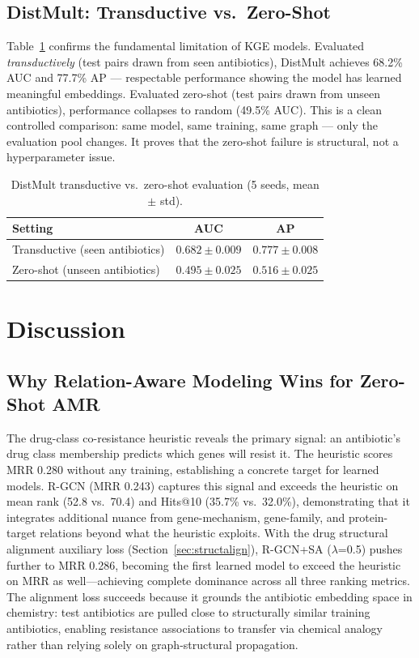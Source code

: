 \documentclass[conference]{IEEEtran}
\begin{document}
\subsection{DistMult: Transductive vs.\ Zero-Shot}

Table~\ref{tab:distmult} confirms the fundamental limitation of KGE models. Evaluated \textit{transductively} (test pairs drawn from seen antibiotics), DistMult achieves 68.2\% AUC and 77.7\% AP --- respectable performance showing the model has learned meaningful embeddings. Evaluated zero-shot (test pairs drawn from unseen antibiotics), performance collapses to random (49.5\% AUC). This is a clean controlled comparison: same model, same training, same graph --- only the evaluation pool changes. It proves that the zero-shot failure is structural, not a hyperparameter issue.

\begin{table}[h]
\centering
\caption{DistMult transductive vs.\ zero-shot evaluation (5 seeds, mean $\pm$ std).}
\label{tab:distmult}
\begin{tabular}{lcc}
\toprule
\textbf{Setting} & \textbf{AUC} & \textbf{AP} \\
\midrule
Transductive (seen antibiotics)   & $0.682 \pm 0.009$ & $0.777 \pm 0.008$ \\
Zero-shot (unseen antibiotics)    & $0.495 \pm 0.025$ & $0.516 \pm 0.025$ \\
\bottomrule
\end{tabular}
\end{table}

\section{Discussion}

\subsection{Why Relation-Aware Modeling Wins for Zero-Shot AMR}

The drug-class co-resistance heuristic reveals the primary signal: an antibiotic's drug class membership predicts which genes will resist it. The heuristic scores MRR 0.280 without any training, establishing a concrete target for learned models. R-GCN (MRR 0.243) captures this signal and exceeds the heuristic on mean rank (52.8 vs.\ 70.4) and Hits@10 (35.7\% vs.\ 32.0\%), demonstrating that it integrates additional nuance from gene-mechanism, gene-family, and protein-target relations beyond what the heuristic exploits. With the drug structural alignment auxiliary loss (Section~\ref{sec:structalign}), R-GCN+SA ($\lambda$=0.5) pushes further to MRR 0.286, becoming the first learned model to exceed the heuristic on MRR as well---achieving complete dominance across all three ranking metrics. The alignment loss succeeds because it grounds the antibiotic embedding space in chemistry: test antibiotics are pulled close to structurally similar training antibiotics, enabling resistance associations to transfer via chemical analogy rather than relying solely on graph-structural propagation.
\end{document}
